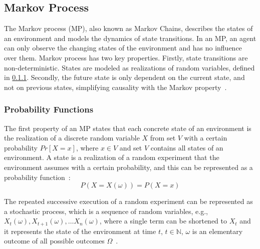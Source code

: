 \documentclass[../xlapes02]{subfiles}
\begin{document}
    \subsection{Markov Process}\label{subsec:markov-process}
    The Markov process (MP), also known as Markov Chains, describes the states of an environment and models the dynamics of state transitions. In an MP, an agent can only observe the changing states of the environment and has no influence over them. Markov process has two key properties. Firstly, state transitions are non-deterministic. States are modeled as realizations of random variables, defined in \cref{subsubsec:probability-functions}. Secondly, the future state is only dependent on the current state, and not on previous states, simplifying causality with the Markov property~\cite{rao2022foundations, inproceedings}.

    \subsubsection{Probability Functions}\label{subsubsec:probability-functions}
    The first property of an MP states that each concrete state of an environment is the realization of a discrete random variable $X$ from set $V$ with a certain probability $Pr\left[X=x\right]$, where $x \in V$ and set $V$ contains all states of an environment. A state is a realization of a random experiment that the environment assumes with a certain probability, and this can be represented as a probability function~\cite{FITMT25127}:
    \begin{equation}
        P(X = X(\omega)) = P(X = x)
    \end{equation}

    The repeated successive execution of a random experiment can be represented as a stochastic process, which is a sequence of random variables, e.g., $X_t(\omega), X_{t+1}(\omega), \ldots X_n(\omega)$, where a single term can be shortened to $X_t$ and it represents the state of the environment at time $t$, $t\in\mathbb{N}$, $\omega$ is an elementary outcome of all possible outcomes $\Omega$~\cite{inproceedings, rao2022foundations}.
\end{document}
